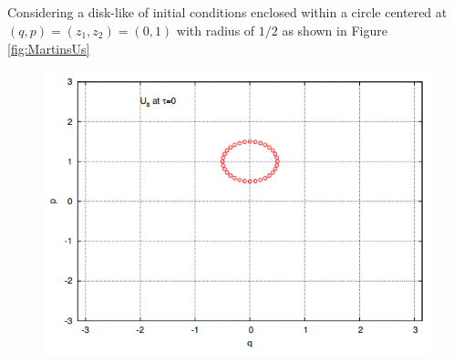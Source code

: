 \subsection{}
Considering a disk-like of initial conditions enclosed within a circle centered at $(q,p)=(z_1,z_2)=(0,1)$ with radius of $1/2$ as shown in Figure \ref{fig:MartinsUs}
\begin{figure}
    \centering
    \includegraphics[width=\columnwidth]{CodeAndFigures/Fig1InitialConditionsUs.png}
    \label{fig:my_label}
\end{figure}

